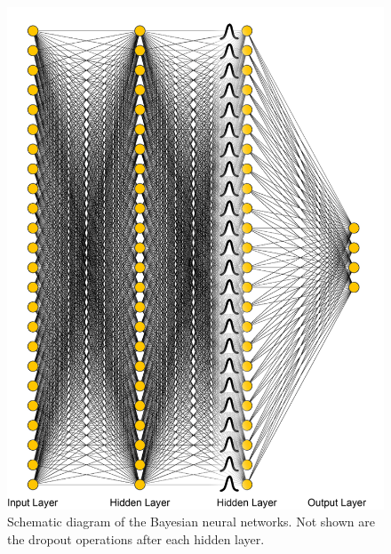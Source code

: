 \begin{figure}[!htp]
\begin{minipage}[b][][b]{.35\linewidth}
\end{minipage}
\hfill
\begin{minipage}[b][][b]{.61\linewidth}
    \includegraphics[width=\linewidth]{templates/images/Figure-BNN.png}
    \caption[Bayesian neural network structural schematic]{Schematic diagram of the Bayesian neural networks. Not shown are the dropout operations after each hidden layer.}
    \label{fig:bnn_dot_structure}
\end{minipage}
\end{figure}

